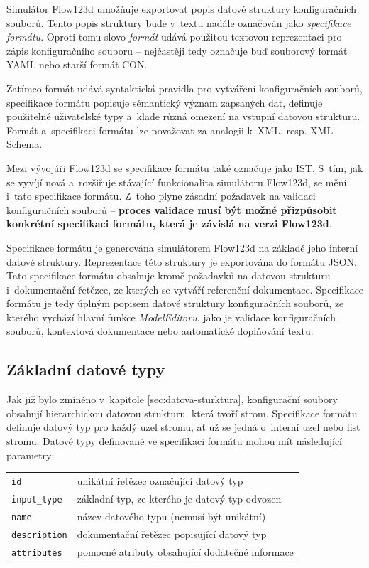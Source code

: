\documentclass[FM,bw,DP]{tulthesis}
\begin{document}
Simulátor Flow123d umožňuje exportovat popis datové struktury konfiguračních souborů. Tento popis struktury bude v~textu nadále označován jako \textit{specifikace formátu}. Oproti tomu slovo \textit{formát} udává použitou textovou reprezentaci pro zápis konfiguračního souboru -- nejčastěji tedy označuje buď souborový formát \gls{YAML} nebo starší formát \gls{CON}.

Zatímco formát udává syntaktická pravidla pro vytváření konfiguračních souborů, specifikace formátu popisuje sémantický význam zapsaných dat, definuje použitelné uživatelské typy a~klade různá omezení na vstupní datovou strukturu. Formát a~specifikaci formátu lze považovat za analogii k~\gls{XML}, resp. \gls{XML} Schema.

Mezi vývojáři Flow123d se specifikace formátu také označuje jako \gls{IST}. S~tím, jak se vyvíjí nová a~rozšiřuje stávající funkcionalita simulátoru Flow123d, se mění i~tato specifikace formátu. Z~toho plyne zásadní požadavek na validaci konfiguračních souborů -- \textbf{proces validace musí být možné přizpůsobit konkrétní specifikaci formátu, která je závislá na verzi Flow123d}.

Specifikace formátu je generována simulátorem Flow123d na základě jeho interní datové struktury. Reprezentace této struktury je exportována do formátu \gls{JSON}. Tato specifikace formátu obsahuje kromě požadavků na datovou strukturu i~dokumentační řetězce, ze kterých se vytváří referenční dokumentace. Specifikace formátu je tedy úplným popisem datové struktury konfiguračních souborů, ze kterého vychází hlavní funkce \textit{ModelEditoru}, jako je validace konfiguračních souborů, kontextová dokumentace nebo automatické doplňování textu.

\subsection{Základní datové typy}
\label{sec:analyza-specifikace-formatu-zakladni-datove-typy}
Jak již bylo zmíněno v~kapitole \ref{sec:datova-sturktura}, konfigurační soubory obsahují hierarchickou datovou strukturu, která tvoří strom. Specifikace formátu definuje datový typ pro každý uzel stromu, ať už se jedná o~interní uzel nebo list stromu. Datové typy definované ve specifikaci formátu mohou mít následující parametry:


\vspace{0.5cm}
\begin{tabular}{m{3cm}@{}l}
\texttt{id}\dotfill & unikátní řetězec označující datový typ \\
\texttt{input\_type}\dotfill & základní typ, ze kterého je datový typ odvozen  \\
\texttt{name}\dotfill & název datového typu (nemusí být unikátní) \\
\texttt{description}\dotfill & dokumentační řetězec popisující datový typ \\
\texttt{attributes}\dotfill & pomocné atributy obsahující dodatečné informace \\
\end{tabular}
\vspace{0.5cm}
\end{document}

